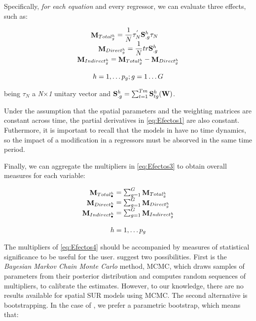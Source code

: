 \documentclass[article]{jss}
\begin{document}
Specifically, \emph{for each equation} and every regressor, we can evaluate three effects, such as:

\begin{equation}
\begin{array}{c} {\mathop{{\bf M}}\nolimits_{Total_{g}^{h}}} = \dfrac{1}{N} \tau^{'}_{N} {\bf S}^{h}_{.g} \tau_{N} \ \ \ \\
{\mathop{{\bf M}}\nolimits_{Direct_{g}^{h}}} = \dfrac{1}{N} tr {\bf S}^{h}_{.g}\\
{\mathop{{\bf M}}\nolimits_{Indirect_{g}^{h}}} = {\mathop{{\bf M}}\nolimits_{Total_{g}^{h}}} -{\mathop{{\bf M}}\nolimits_{Direct_{g}^{h}}} \\
\\ h=1,\ldots p_{g}; g=1 \ldots G \end{array}
\label{eq:Efectos3}
\end{equation}

being \(\tau_{N}\) a \emph{N}\(\times\)\emph{1} unitary vector and \({\bf S}^{h}_{.g}= \sum_{t=1}^{Tm} {\bf S}^{h}_{tg}({\bf W})\).

Under the assumption that the spatial parameters and the weighting matrices are constant across time, the partial derivatives in \eqref{eq:Efectos1} are also constant. Futhermore, it is important to recall that the models in  have no time dynamics, so the impact of a modification in a regressors must be absorved in the same time period.

Finally, we can aggregate the multipliers in \eqref{eq:Efectos3} to obtain overall measures for each variable:

\begin{equation}
\begin{array}{c} {\mathop{{\bf M}}\nolimits_{Total_{\bullet}^{h}}} = \sum_{g=1}^{G} {\mathop{{\bf M}}\nolimits_{Total_{g}^{h}}} \\  {\mathop{{\bf M}}\nolimits_{Direct_{\bullet}^{h}}} = \sum_{g=1}^{G} {\mathop{{\bf M}}\nolimits_{Direct_{g}^{h}}}  \\  {\mathop{{\bf M}}\nolimits_{Indirect_{\bullet}^{h}}} = \sum_{g=1}^{G} {\mathop{{\bf M}}\nolimits_{Indirect_{g}^{h}}} \\ \\ h=1,\ldots p_{g} \end{array}
\label{eq:Efectos4}
\end{equation}

The multipliers of \eqref{eq:Efectos4} should be accompanied by measures of statistical significance to be useful for the user. \citet{LeSage2009} suggest two possibilities. First is the \emph{Bayesian Markov Chain Monte Carlo} method, MCMC, which draws samples of parameters from their posterior distribution and computes random sequences of multipliers, to calibrate the estimates. However, to our knowledge, there are no results available for spatial SUR models using MCMC. The second alternative is bootstrapping. In the case of , we prefer a parametric bootstrap, which means that:
\end{document}
